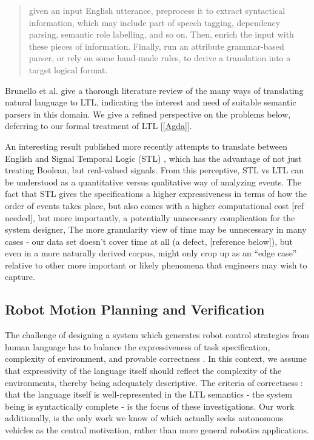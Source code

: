 \documentclass{article}
\newcommand\sbref[1]{[\ref{#1}]}
\begin{document}
\begin{quote}
given an input English utterance, preprocess it to extract syntactical information, which may
include part of speech tagging, dependency parsing, semantic role labelling, and so on. Then,
enrich the input with these pieces of information. Finally, run an attribute grammar-based
parser, or rely on some hand-made rules, to derive a translation into a target logical format.
\cite{brunello_et_al}
\end{quote}

Brunello et al. give a thorough literature review of the many ways of
translating natural language to LTL, indicating the interest and need of
suitable semantic parsers in this domain. We give a refined perspective on the
problems below, deferring to our formal treatment of LTL \sbref{Agda}.


An interesting result published more recently attempts to translate between
English and Signal Temporal Logic (STL) \cite{he2021english}, which has the
advantage of not just treating Boolean, but real-valued signals. From this
perceptive, STL vs LTL can be understood as a quantitative versus qualitative
way of analyzing events. The fact that STL gives the specifications a higher
expressiveness in terms of how the order of events takes place, but also comes
with a higher computational cost [ref needed], but more importantly, a
potentially unnecessary complication for the system designer, The more
granularity view of time may be unnecessary in many cases - our data set doesn't
cover time at all (a defect, [reference below]), but even in a more naturally
derived corpus, might only crop up as an ``edge case'' relative to other more
important or likely phenomena that engineers may wish to capture.


\subsection{Robot Motion Planning and Verification}

The challenge of designing a system which generates robot control strategies
from human language has to balance the expressiveness of task specification,
complexity of environment, and provable correctness \cite{4141034}. In this
context, we assume that expressivity of the language itself should reflect the
complexity of the environments, thereby being adequately descriptive. The
criteria of correctness : that the language itself is well-represented in the
LTL semantics - the system being is syntactically complete - is the focus of
these investigations. Our work additionally, is the only work we know of which
actually seeks autonomous vehicles as the central motivation, rather than more
general robotics applications.
\end{document}
